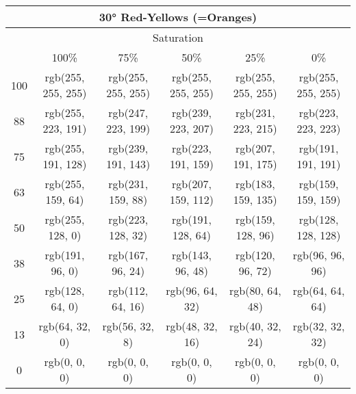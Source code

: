 \documentclass[a4j]{jarticle}
\begin{document}
\begin{tabular}{|c|c|c|c|c|c|}
\multicolumn{6}{|c|}{30° Red-Yellows
 (=Oranges)}\\\hline\multicolumn{6}{|c|}{Saturation}\\\hline&100\%&75\%&50\%&25\%&0\%\\\hline100&rgb(255,
     255, 255)&rgb(255, 255, 255)&rgb(255, 255, 255)&rgb(255, 255,
                 255)&rgb(255, 255, 255)\\\hline88&rgb(255, 223,
     191)&rgb(247, 223, 199)&rgb(239, 223, 207)&rgb(231, 223,
                 215)&rgb(223, 223, 223)\\\hline75&rgb(255, 191,
     128)&rgb(239, 191, 143)&rgb(223, 191, 159)&rgb(207, 191,
                 175)&rgb(191, 191, 191)\\\hline63&rgb(255, 159,
     64)&rgb(231, 159, 88)&rgb(207, 159, 112)&rgb(183, 159,
                 135)&rgb(159, 159, 159)\\\hline50&rgb(255, 128,
     0)&rgb(223, 128, 32)&rgb(191, 128, 64)&rgb(159, 128, 96)&rgb(128,
                     128, 128)\\\hline38&rgb(191, 96, 0)&rgb(167, 96,
         24)&rgb(143, 96, 48)&rgb(120, 96, 72)&rgb(96, 96,
                     96)\\\hline25&rgb(128, 64, 0)&rgb(112, 64,
         16)&rgb(96, 64, 32)&rgb(80, 64, 48)&rgb(64, 64,
                     64)\\\hline13&rgb(64, 32, 0)&rgb(56, 32, 8)&rgb(48,
             32, 16)&rgb(40, 32, 24)&rgb(32, 32, 32)\\\hline0&rgb(0, 0,
     0)&rgb(0, 0, 0)&rgb(0, 0, 0)&rgb(0, 0, 0)&rgb(0, 0, 0) 
\end{tabular}
\end{document}
